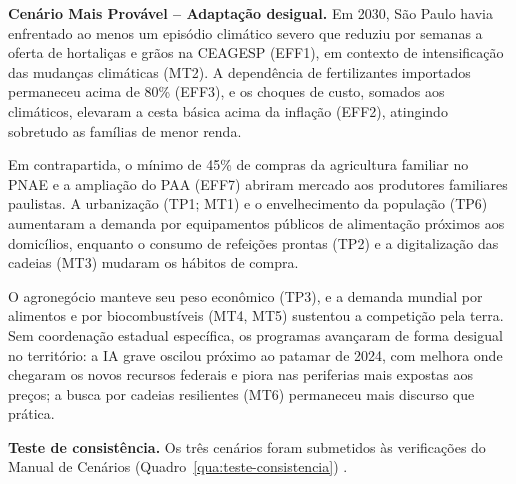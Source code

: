 \documentclass[
	12pt,				%
	openright,			%
	oneside,			%
	a4paper,			%
	chapter=TITLE,		%
	section=TITLE,		%
	english,			%
	french,				%
	spanish,			%
	brazil,				%
 ]{abntex2}
\begin{document}
\textbf{Cenário Mais Provável -- Adaptação desigual.} Em 2030, São Paulo havia
enfrentado ao menos um episódio climático severo que reduziu por semanas a
oferta de hortaliças e grãos na CEAGESP (EFF1), em contexto de intensificação
das mudanças climáticas (MT2). A dependência de fertilizantes importados
permaneceu acima de 80\% (EFF3), e os choques de custo, somados aos climáticos,
elevaram a cesta básica acima da inflação (EFF2), atingindo sobretudo as
famílias de menor renda.

Em contrapartida, o mínimo de 45\% de compras da agricultura familiar no PNAE e
a ampliação do PAA (EFF7) abriram mercado aos produtores familiares paulistas.
A urbanização (TP1; MT1) e o envelhecimento da população (TP6) aumentaram a
demanda por equipamentos públicos de alimentação próximos aos domicílios,
enquanto o consumo de refeições prontas (TP2) e a digitalização das cadeias
(MT3) mudaram os hábitos de compra.

O agronegócio manteve seu peso econômico (TP3), e a demanda mundial por
alimentos e por biocombustíveis (MT4, MT5) sustentou a competição pela terra.
Sem coordenação estadual específica, os programas avançaram de forma desigual no
território: a IA grave oscilou próximo ao patamar de 2024, com melhora onde
chegaram os novos recursos federais e piora nas periferias mais expostas aos
preços; a busca por cadeias resilientes (MT6) permaneceu mais discurso que
prática.

\textbf{Teste de consistência.} Os três cenários foram submetidos às
verificações do Manual de Cenários (Quadro~\ref{qua:teste-consistencia})
\cite[cap. 6]{araujo_cenarios2026}.
\end{document}
